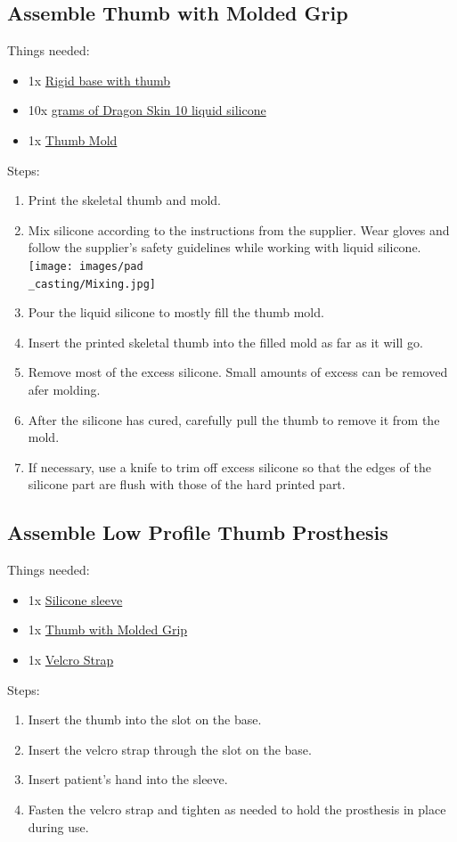 \documentclass[11pt]{article}
\begin{document}
\subsection{Assemble Thumb with Molded Grip}
Things needed:
\begin{itemize}
\item 1x \hyperlink{thing_rigid\_base}{Rigid base with thumb}
\item 10x \hyperlink{thing_g\_dragon\_skin\_10}{grams of Dragon Skin 10 liquid silicone}
\item 1x \hyperlink{thing_thumb\_mold}{Thumb Mold}
\end{itemize}
Steps:
\begin{enumerate}
\item Print the skeletal thumb and mold.
\item Mix silicone according to the instructions from the supplier. Wear gloves and follow the supplier's safety guidelines while working with liquid silicone.\\ \texttt{[image: images/pad\\\_casting/Mixing.jpg]}
\item Pour the liquid silicone to mostly fill the thumb mold.
\item Insert the printed skeletal thumb into the filled mold as far as it will go.
\item Remove most of the excess silicone. Small amounts of excess can be removed afer molding.
\item After the silicone has cured, carefully pull the thumb to remove it from the mold.
\item If necessary, use a knife to trim off excess silicone so that the edges of the silicone part are flush with those of the hard printed part.
\end{enumerate}

\subsection{Assemble Low Profile Thumb Prosthesis}
Things needed:
\begin{itemize}
\item 1x \hyperlink{thing_silicone\_sleeve}{Silicone sleeve}
\item 1x \hyperlink{thing_molded\_thumb}{Thumb with Molded Grip}
\item 1x \hyperlink{thing_velcro\_strap}{Velcro Strap}
\end{itemize}
Steps:
\begin{enumerate}
\item Insert the thumb into the slot on the base.
\item Insert the velcro strap through the slot on the base.
\item Insert patient's hand into the sleeve.
\item Fasten the velcro strap and tighten as needed to hold the prosthesis in place during use.
\end{enumerate}

\newpage
\end{document}
